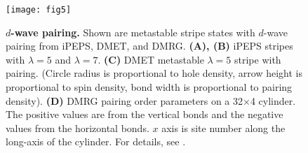\documentclass[12pt]{article}
\begin{document}
\begin{figure}[htpb]
  \centering
  \texttt{[image: fig5]}
  \caption{{\bf $d$-wave pairing.} Shown are metastable stripe states with $d$-wave pairing from iPEPS, DMET, and DMRG. {\bf(A), (B)} iPEPS stripes with $\lambda=5$ and $\lambda=7$. 
  {\bf(C)} DMET metastable $\lambda=5$ stripe with pairing. (Circle radius is proportional to hole density, arrow height is proportional to spin density, 
bond width is proportional to pairing density). {\bf(D)} DMRG pairing order parameters on a 32$\times$4 cylinder.
    The positive values are from the vertical bonds and the negative values from the horizontal bonds. $x$ axis is site number along the long-axis of the cylinder. For details, see \cite{supplementary}.}
  \label{fig:sc_stripes}
\end{figure}
\end{document}
